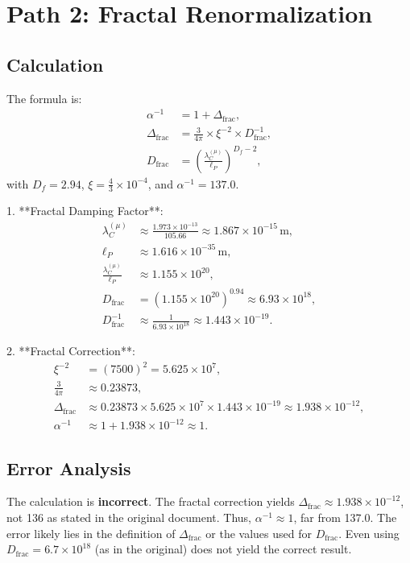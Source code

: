 \documentclass[12pt,a4paper]{article}
\theoremstyle{definition}
\begin{document}
	\section{Path 2: Fractal Renormalization}
	\subsection{Calculation}
	The formula is:
	\begin{align}
		\alpha^{-1} &= 1 + \Delta_{\text{frac}}, \\
		\Delta_{\text{frac}} &= \frac{3}{4\pi} \times \xi^{-2} \times D_{\text{frac}}^{-1}, \\
		D_{\text{frac}} &= \left( \frac{\lambda_C^{(\mu)}}{\ell_P} \right)^{D_f - 2},
	\end{align}
	with \(D_f = 2.94\), \(\xi = \frac{4}{3} \times 10^{-4}\), and \(\alpha^{-1} = 137.0\).
	
	1. **Fractal Damping Factor**:
	\begin{align}
		\lambda_C^{(\mu)} &\approx \frac{1.973 \times 10^{-13}}{105.66} \approx 1.867 \times 10^{-15} \, \text{m}, \\
		\ell_P &\approx 1.616 \times 10^{-35} \, \text{m}, \\
		\frac{\lambda_C^{(\mu)}}{\ell_P} &\approx 1.155 \times 10^{20}, \\
		D_{\text{frac}} &= (1.155 \times 10^{20})^{0.94} \approx 6.93 \times 10^{18}, \\
		D_{\text{frac}}^{-1} &\approx \frac{1}{6.93 \times 10^{18}} \approx 1.443 \times 10^{-19}.
	\end{align}
	
	2. **Fractal Correction**:
	\begin{align}
		\xi^{-2} &= (7500)^2 = 5.625 \times 10^7, \\
		\frac{3}{4\pi} &\approx 0.23873, \\
		\Delta_{\text{frac}} &\approx 0.23873 \times 5.625 \times 10^7 \times 1.443 \times 10^{-19} \approx 1.938 \times 10^{-12}, \\
		\alpha^{-1} &\approx 1 + 1.938 \times 10^{-12} \approx 1.
	\end{align}
	
	\subsection{Error Analysis}
	\begin{tcolorbox}[colback=red!5!white,colframe=deepred,title=Error]
		The calculation is \textbf{incorrect}. The fractal correction yields \(\Delta_{\text{frac}} \approx 1.938 \times 10^{-12}\), not 136 as stated in the original document. Thus, \(\alpha^{-1} \approx 1\), far from 137.0. The error likely lies in the definition of \(\Delta_{\text{frac}}\) or the values used for \(D_{\text{frac}}\). Even using \(D_{\text{frac}} = 6.7 \times 10^{18}\) (as in the original) does not yield the correct result.
	\end{tcolorbox}
	
\end{document}
